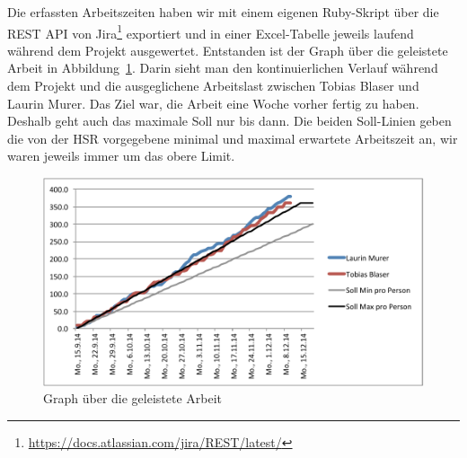 	Die erfassten Arbeitszeiten haben wir mit einem eigenen Ruby-Skript über die REST API von Jira\footnote{\url{https://docs.atlassian.com/jira/REST/latest/}} exportiert
	und in einer Excel-Tabelle jeweils laufend während dem Projekt ausgewertet.
	Entstanden ist der Graph über die geleistete Arbeit in Abbildung\ \ref{fig:workGraph}.
	Darin sieht man den kontinuierlichen Verlauf während dem Projekt
	und die ausgeglichene Arbeitslast zwischen Tobias Blaser und Laurin Murer.
	Das Ziel war, die Arbeit eine Woche vorher fertig zu haben.
	Deshalb geht auch das maximale Soll nur bis dann.
	Die beiden Soll-Linien geben die von der HSR vorgegebene minimal und maximal erwartete Arbeitszeit an,
	wir waren jeweils immer um das obere Limit.
	\begin{figure}[H]
		\includegraphics[width=\textwidth]{projectPlan/media/img/workGraph.pdf}
		\centering
		\caption{Graph über die geleistete Arbeit}
		\label{fig:workGraph}
	\end{figure}

